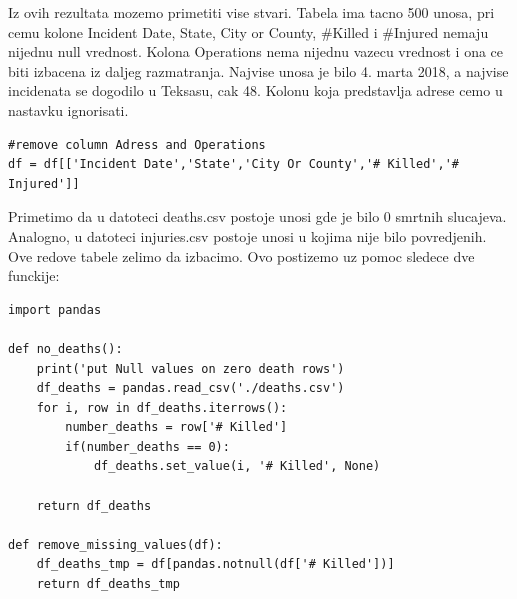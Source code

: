 \documentclass[11pt]{article} %
\begin{document}
Iz ovih rezultata mozemo primetiti vise stvari. Tabela ima tacno 500 unosa, pri cemu kolone Incident Date, State, City or County, \#Killed i \#Injured nemaju nijednu null vrednost. 
Kolona Operations nema nijednu vazecu vrednost i ona ce biti izbacena iz daljeg razmatranja. Najvise unosa je bilo 4. marta 2018, a najvise incidenata se dogodilo u Teksasu, cak 48.
Kolonu koja predstavlja adrese cemo u nastavku ignorisati. 
\begin{lstlisting}
#remove column Adress and Operations
df = df[['Incident Date','State','City Or County','# Killed','# Injured']]
\end{lstlisting}
Primetimo da u datoteci deaths.csv postoje unosi gde je bilo 0 smrtnih slucajeva. Analogno, u datoteci injuries.csv postoje unosi u kojima nije bilo povredjenih. Ove redove tabele zelimo da izbacimo.
Ovo postizemo uz pomoc sledece dve funckije:
\begin{lstlisting}
import pandas

def no_deaths():
    print('put Null values on zero death rows')
    df_deaths = pandas.read_csv('./deaths.csv')
    for i, row in df_deaths.iterrows():
        number_deaths = row['# Killed']
        if(number_deaths == 0):
            df_deaths.set_value(i, '# Killed', None)

    return df_deaths

def remove_missing_values(df):
    df_deaths_tmp = df[pandas.notnull(df['# Killed'])]
    return df_deaths_tmp
\end{lstlisting}
\end{document}
